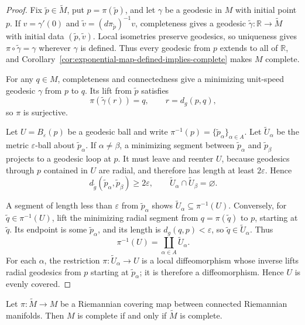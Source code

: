 \begin{proof}
\sketch Fix $\widetilde p\in\widetilde M$, put $p=\pi(\widetilde p)$, and let
$\gamma$ be a geodesic in $M$ with initial point $p$. If
$v=\gamma'(0)$ and
$\widetilde v=(d\pi_{\widetilde p})^{-1}v$, completeness gives a geodesic
$\widetilde\gamma\colon\mathbb R\to\widetilde M$ with initial data
$(\widetilde p,\widetilde v)$. Local isometries preserve geodesics, so
uniqueness gives $\pi\circ\widetilde\gamma=\gamma$ wherever $\gamma$ is
defined. Thus every geodesic from $p$ extends to all of $\mathbb R$, and
Corollary~\ref{cor:exponential-map-defined-implies-complete} makes $M$
complete.

For any $q\in M$, completeness and connectedness give a minimizing unit-speed
geodesic $\gamma$ from $p$ to $q$. Its lift from $\widetilde p$ satisfies
\[
\pi(\widetilde\gamma(r))=q,
\qquad r=d_g(p,q),
\]
so $\pi$ is surjective.

Let $U=B_\varepsilon(p)$ be a geodesic ball and write
$\pi^{-1}(p)=\{\widetilde p_\alpha\}_{\alpha\in A}$. Let
$\widetilde U_\alpha$ be the metric $\varepsilon$-ball about
$\widetilde p_\alpha$. If $\alpha\ne\beta$, a minimizing segment between
$\widetilde p_\alpha$ and $\widetilde p_\beta$ projects to a geodesic loop at
$p$. It must leave and reenter $U$, because geodesics through $p$ contained in
$U$ are radial, and therefore has length at least $2\varepsilon$. Hence
\[
d_{\widetilde g}(\widetilde p_\alpha,\widetilde p_\beta)
\geq2\varepsilon,
\qquad
\widetilde U_\alpha\cap\widetilde U_\beta=\varnothing.
\]

A segment of length less than $\varepsilon$ from $\widetilde p_\alpha$ shows
$\widetilde U_\alpha\subseteq\pi^{-1}(U)$. Conversely, for
$\widetilde q\in\pi^{-1}(U)$, lift the minimizing radial segment from
$q=\pi(\widetilde q)$ to $p$, starting at $\widetilde q$. Its endpoint is
some $\widetilde p_\alpha$, and its length is
$d_g(q,p)<\varepsilon$, so $\widetilde q\in\widetilde U_\alpha$. Thus
\[
\pi^{-1}(U)=\coprod_{\alpha\in A}\widetilde U_\alpha.
\]
For each $\alpha$, the restriction
$\pi\colon\widetilde U_\alpha\to U$ is a local diffeomorphism whose inverse
lifts radial geodesics from $p$ starting at $\widetilde p_\alpha$; it is
therefore a diffeomorphism. Hence $U$ is evenly covered.
\end{proof}

\begin{corollary}
\label{cor:complete-iff-covering-complete}





Let $\pi\colon\widetilde M\to M$ be a Riemannian covering map between
connected Riemannian manifolds. Then $M$ is complete if and only if
$\widetilde M$ is complete.
\end{corollary}

